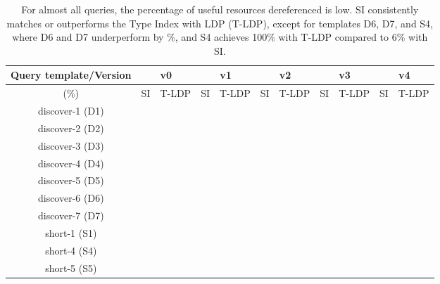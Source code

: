 \begin{table}[htbp]
	\begin{center}
		\begin{tabular}{|c|c|c|c|c|c|c|c|c|c|c|}
			\hline
            \multicolumn{1}{|c}{Query template/Version} & \multicolumn{2}{|c|}{v0} & \multicolumn{2}{|c|}{v1} & \multicolumn{2}{|c|}{v2} & \multicolumn{2}{|c|}{v3} & \multicolumn{2}{|c|}{v4} \\
			\hline
            (\%) & SI  & T-LDP & SI & T-LDP & SI & T-LDP& SI & T-LDP & SI & T-LDP \\
            \hline
			discover-1 (D1) & {} & {} & {} & {} & {} & {} & {} & {} & {} & {} \\
            \hline
            discover-2 (D2) & {} & {} & {} & {} & {} & {} & {} & {} & {} & {} \\
			\hline
            discover-3 (D3) & {} & {} & {} & {} & {} & {} & {} & {} & {} & {} \\
			\hline
            discover-4 (D4) & {} & {} & {} & {} & {} & {} & {} & {} & {} & {} \\
			\hline
            discover-5 (D5) & {} & {} & {} & {} & {} & {} & {} & {} & {} & {} \\
			\hline
            discover-6 (D6) & {} & {} & {} & {} & {} & {} & {} & {} & {} & {} \\
			\hline
            discover-7 (D7) & {} & {} & {} & {} & {} & {} & {} & {} & {} & {} \\
			\hline
            short-1 (S1) & {} & {} & {} & {} & {} & {} & {} & {} & {} & {} \\
			\hline
            short-4 (S4) & {} & {} & {} & {} & {} & {} & {} & {} & {} & {} \\
			\hline
            short-5 (S5) & {} & {} & {} & {} & {} & {} & {} & {} & {} & {} \\
			\hline
		\end{tabular}
	\end{center}
	\caption{
        For almost all queries, the percentage of useful resources dereferenced is low. 
		SI consistently matches or outperforms the Type Index with LDP (T-LDP), except for templates D6, D7, and S4, where D6 and D7 underperform by \%, and S4 achieves 100\% with T-LDP compared to 6\% with SI.
		}
	\label{tab:ratioUsefulResources}
\end{table}